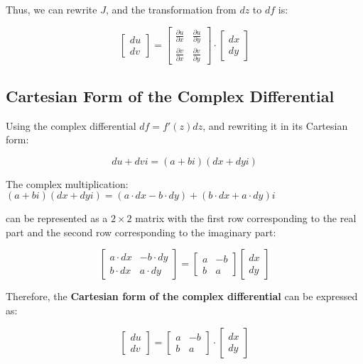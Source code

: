 \documentclass[a4paper,10.5pt]{article}
\begin{document}
Thus, we can rewrite $J$, and the transformation from $dz$ to $df$ is:

\begin{equation}
\begin{bmatrix}
du \\
dv
\end{bmatrix} =
\begin{bmatrix}
\frac{\partial{u}}{\partial{x}} & \frac{\partial{u}}{\partial{y}} \\
\frac{\partial{v}}{\partial{x}} & \frac{\partial{v}}{\partial{y}}
\end{bmatrix}
\cdot
\begin{bmatrix}
dx \\
dy
\end{bmatrix}
\end{equation}

\subsection{Cartesian Form of the Complex Differential}

Using the complex differential $df = f'(z)dz$, and rewriting it in its Cartesian form:

\begin{equation}
du + dvi = (a+bi)(dx+dyi)
\end{equation}

The complex multiplication:$(a+bi)(dx+dyi) = (a \cdot dx - b \cdot dy) + (b \cdot dx + a \cdot dy)i$

can be represented as a $2 \times 2$ matrix with the first row corresponding to the real part and the second row corresponding to the imaginary part:

\begin{equation}
\begin{bmatrix}
a \cdot dx & -b \cdot dy \\
b \cdot dx & a \cdot dy
\end{bmatrix} =
\begin{bmatrix}
a & -b \\
b & a
\end{bmatrix}
\begin{bmatrix}
dx \\
dy
\end{bmatrix}
\end{equation}

Therefore, the \textbf{Cartesian form of the complex differential} can be expressed as:

\begin{equation}
\begin{bmatrix}
du \\
dv
\end{bmatrix} =
\begin{bmatrix}
a & -b \\
b & a
\end{bmatrix}
\cdot
\begin{bmatrix}
dx \\
dy
\end{bmatrix}
\end{equation}
\end{document}
